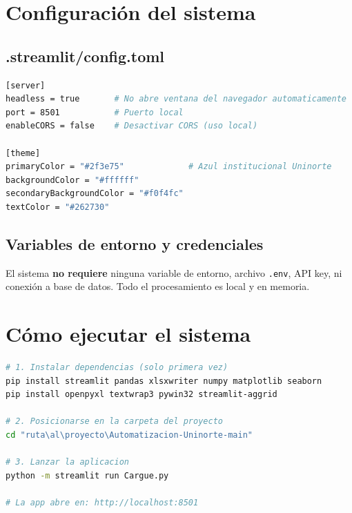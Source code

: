\documentclass[12pt, letterpaper]{article}
\begin{document}
\section{Configuración del sistema}

\subsection{.streamlit/config.toml}

\begin{lstlisting}[language=bash, caption={Configuración de Streamlit}]
[server]
headless = true       # No abre ventana del navegador automaticamente
port = 8501           # Puerto local
enableCORS = false    # Desactivar CORS (uso local)

[theme]
primaryColor = "#2f3e75"             # Azul institucional Uninorte
backgroundColor = "#ffffff"
secondaryBackgroundColor = "#f0f4fc"
textColor = "#262730"
\end{lstlisting}

\subsection{Variables de entorno y credenciales}

El sistema \textbf{no requiere} ninguna variable de entorno, archivo \texttt{.env}, API key, ni conexión a base de datos. Todo el procesamiento es local y en memoria.

\section{Cómo ejecutar el sistema}

\begin{lstlisting}[language=bash, caption={Comandos de instalación y ejecución}]
# 1. Instalar dependencias (solo primera vez)
pip install streamlit pandas xlsxwriter numpy matplotlib seaborn
pip install openpyxl textwrap3 pywin32 streamlit-aggrid

# 2. Posicionarse en la carpeta del proyecto
cd "ruta\al\proyecto\Automatizacion-Uninorte-main"

# 3. Lanzar la aplicacion
python -m streamlit run Cargue.py

# La app abre en: http://localhost:8501
\end{lstlisting}
\end{document}
